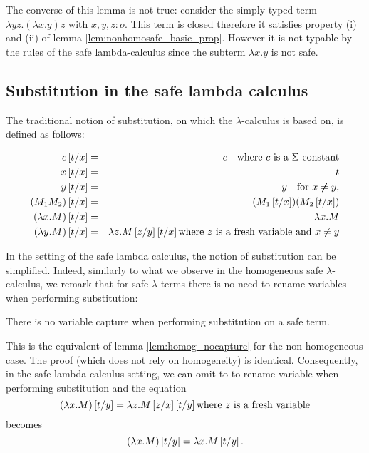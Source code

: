 The converse of this lemma is not true: consider the simply typed term $\lambda y z. (\lambda x . y ) z$ with $x,y,z:o$. This term is closed therefore it satisfies
property (i) and (ii) of lemma \ref{lem:nonhomosafe_basic_prop}. However it is not typable by the rules of the safe lambda-calculus since the subterm
$\lambda x .y$ is not safe.

\subsection{Substitution in the safe lambda calculus}

The traditional notion of substitution, on which the
$\lambda$-calculus is based on, is defined as follows:
\begin{dfn}[Substitution]
\label{dfn:subst}
\begin{eqnarray*}
c \left[ t/x \right] &=& c \quad \mbox{where $c$ is a $\Sigma$-constant}\\
x \left[ t/x \right] &=& t\\
 y\left[ t/x \right] &=& y \quad \mbox{for } x \not \neq y,\\
(M_1 M_2) \left[ t/x \right] &=& (M_1 \left[ t/x \right]) (M_2 \left[ t/x \right])\\
(\lambda x . M) \left[ t/x \right] &=& \lambda x . M\\
(\lambda y . M) \left[ t/x \right] &=& \lambda z . M \left[ z/y \right]
\left[ t/x \right] \mbox{where $z$ is a fresh variable and $x\not = y$}
\end{eqnarray*}
\end{dfn}

In the setting of the safe lambda calculus, the notion of
substitution can be simplified. Indeed, similarly to what we observe in the homogeneous
safe $\lambda$-calculus, we remark that for safe
$\lambda$-terms there is no need to rename variables when performing
substitution:

\begin{lem}
\label{lem:noclash} There is no variable capture when performing
substitution on a safe term.
\end{lem}

This is the equivalent of lemma \ref{lem:homog_nocapture} for the non-homogeneous case. The proof (which does not rely on homogeneity)
is identical.
Consequently, in the safe lambda calculus setting, we can omit to to rename
variable when performing substitution and the equation
$$(\lambda x . M) \left[ t/y \right] = \lambda z . M \left[ z/x \right]
\left[ t/y \right] \mbox{where $z$ is a fresh variable}$$ becomes
$$(\lambda x . M) \left[ t/y \right] = \lambda x . M \left[ t/y \right].$$

